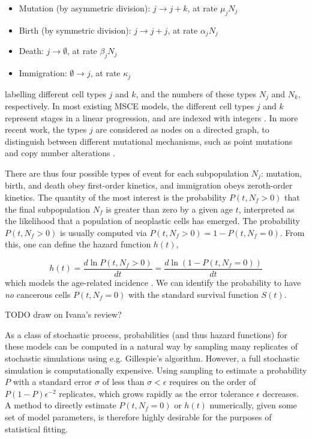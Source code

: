 \documentclass{article}
\begin{document}
\begin{itemize}
    \item Mutation (by asymmetric division): $j \rightarrow j + k$, at rate
    $\mu_j N_j$
    \item Birth (by symmetric division): $j \rightarrow j + j$, at rate
    $\alpha_j N_j$
    \item Death: $j \rightarrow \emptyset$, at rate $\beta_j N_j$
    \item Immigration: $\emptyset \rightarrow j$, at rate $\kappa_j$
\end{itemize}
labelling different cell types $j$ and $k$, and the numbers of these types $N_j$
and $N_k$, respectively. In most existing MSCE models, the different cell types $j$
and $k$ represent stages in a linear progression, and are indexed with
integers \cite{moolgavkar1992multistage,luebeck2013impact}. In more recent work,
the types $j$ are considered as nodes on a directed graph, to distinguish
between different mutational mechanisms, such as point mutations and copy number
alterations \cite{patersonbozic2020colorectal,Paterson2022}.


There are thus four possible types of event for each subpopulation $N_j$: mutation,
birth, and death obey first-order kinetics, and immigration obeys zeroth-order
kinetics. The quantity of the most interest is
the probability $P(t,N_f > 0)$ that the final subpopulation $N_f$ is greater than
zero by a given age
$t$, interpreted as the likelihood that a population of neoplastic cells has emerged.
The probability $P(t,N_f > 0)$ is usually computed via $P(t,N_f > 0) = 1 - P(t,N_f = 0)$.
From this, one can define the hazard function $h(t)$,

\begin{equation}
    h(t) = \frac{d \ln P(t,N_f > 0)}{dt} = \frac{d \ln(1 - P(t,N_f = 0))}{dt}
\end{equation}
which models the age-related incidence \cite{luebeck2013impact}. We can
identify the probability to have \emph{no} cancerous cells $P(t,N_f = 0)$ with
the standard survival function $S(t)$.

TODO draw on Ivana's review?

As a class of stochastic process, probabilities (and thus hazard functions) for 
these models can be computed in a natural way by sampling many replicates of 
stochastic simulations using e.g. Gillespie's algorithm. However, a full
stochastic simulation is computationally expensive. Using sampling to estimate 
a probability $P$ with a standard error $\sigma$ of less than $\sigma < \epsilon$ 
requires on the order of
$P (1 - P) \epsilon^{-2}$ replicates, which grows rapidly as the error tolerance $\epsilon$
decreases.
A method to directly estimate $P(t,N_f = 0)$ or $h(t)$ numerically, given some
set of model parameters, is therefore highly desirable for the purposes of
statistical fitting. 
\end{document}
